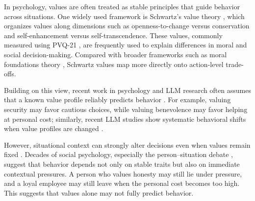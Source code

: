 \documentclass[11pt]{article}
\begin{document}
In psychology, values are often treated as stable principles that guide behavior across situations. One widely used framework is Schwartz’s value theory \citep{schwartz2012refined}, which organizes values along dimensions such as openness-to-change versus conservation and self-enhancement versus self-transcendence. These values, commonly measured using PVQ-21 \citep{schwartz2003proposal}, are frequently used to explain differences in moral and social decision-making. Compared with broader frameworks such as moral foundations theory \citep{haidt2012righteous}, Schwartz values map more directly onto action-level trade-offs.

Building on this view, recent work in psychology and LLM research often assumes that a known value profile reliably predicts behavior \citep{jiao2025ai, harry2026beyond, backmann2025ethics}. For example, valuing security may favor cautious choices, while valuing benevolence may favor helping at personal cost; similarly, recent LLM studies show systematic behavioral shifts when value profiles are changed \citep{sauter2026between, guo2026counterfactual}.

However, situational context can strongly alter decisions even when values remain fixed \citep{nabizadeh2026large, sauter2026between, backmann2025ethics}. Decades of social psychology, especially the person--situation debate \citep{harry2026beyond, soni2025we, peterson2025context}, suggest that behavior depends not only on stable traits but also on immediate contextual pressures. A person who values honesty may still lie under pressure, and a loyal employee may still leave when the personal cost becomes too high. This suggests that values alone may not fully predict behavior.


\end{document}
